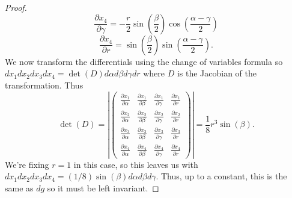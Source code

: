 \documentclass{article}
\begin{document}
\begin{proof}
\[\]
\[
\frac{\partial x_4}{\partial \gamma} = -\frac{r}{2} \sin \left ( \frac{\beta}{2} \right ) \cos \left (\frac{\alpha - \gamma}{2} \right )
\]
\[
\frac{\partial x_4}{\partial r} = \sin \left ( \frac{\beta}{2} \right ) \sin \left (\frac{\alpha - \gamma}{2} \right ).
\]
We now transform the differentials using the change of variables formula so $dx_1dx_2dx_3dx_4 = \det(D) d \alpha d \beta d \gamma d r$ where $D$ is the Jacobian of the transformation. Thus
\[
\det(D) = \left | \left (
\begin{array}{cccc}
\frac{\partial x_1}{\partial \alpha} & \frac{\partial x_1}{\partial \beta} & \frac{\partial x_1}{\partial \gamma} & \frac{\partial x_1}{\partial r}\\
\frac{\partial x_2}{\partial \alpha} & \frac{\partial x_2}{\partial \beta} & \frac{\partial x_2}{\partial \gamma} & \frac{\partial x_2}{\partial r}\\
\frac{\partial x_3}{\partial \alpha} & \frac{\partial x_3}{\partial \beta} & \frac{\partial x_3}{\partial \gamma} & \frac{\partial x_3}{\partial r}\\
\frac{\partial x_4}{\partial \alpha} & \frac{\partial x_4}{\partial \beta} & \frac{\partial x_4}{\partial \gamma} & \frac{\partial x_4}{\partial r}
\end{array}
\right ) \right |
= \frac{1}{8} r^3 \sin(\beta).
\]
We're fixing $r = 1$ in this case, so this leaves us with $dx_1dx_2dx_3dx_4 = (1/8)\sin(\beta) d \alpha d \beta d \gamma$. Thus, up to a constant, this is the same as $dg$ so it must be left invariant.
\end{proof}
\end{document}
